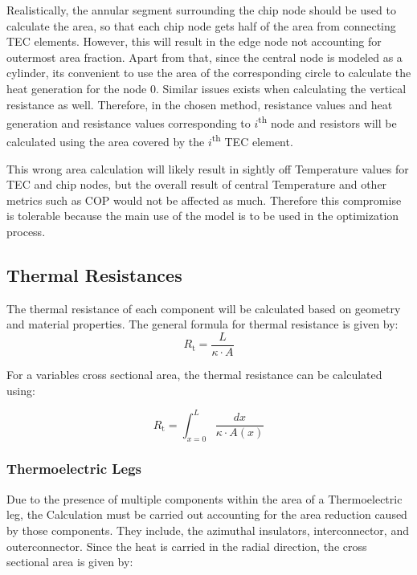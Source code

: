 \documentclass[10pt,a4paper,twocolumn]{article}
\begin{document}
Realistically, the annular segment surrounding the chip node should be used to calculate the area, so that each chip node gets half of the area from connecting TEC elements. However, this will result in the edge node not accounting for outermost area fraction. Apart from that, since the central node is modeled as a cylinder, its convenient to use the area of the corresponding circle to calculate the heat generation for the node 0. Similar issues exists when calculating the vertical resistance as well. Therefore, in the chosen method, resistance values and heat generation and resistance values corresponding to $i$\textsuperscript{th} node and resistors will be calculated using the area covered by the $i$\textsuperscript{th} TEC element.

This wrong area calculation will likely result in sightly off Temperature values for TEC and chip nodes, but the overall result of central Temperature and other metrics such as COP would not be affected as much. Therefore this compromise is tolerable because the main use of the model is to be used in the optimization process.

\subsection{Thermal Resistances}

The thermal resistance of each component will be calculated based on geometry and material properties. The general formula for thermal resistance is given by:
\begin{equation}
  R_{\text{t}} = \frac{L}{\kappa \cdot A}
  \label{eq:thermal_resistance_r}
\end{equation}

For a variables cross sectional area, the thermal resistance can be calculated using:

\begin{equation}
  R_{\text{t}} = \int_{x=0}^{L} \frac{dx}{\kappa \cdot A(x)}
  \label{eq:resistance_r_int}
\end{equation}

\subsubsection{Thermoelectric Legs}

Due to the presence of multiple components within the area of a Thermoelectric leg, the Calculation must be carried out accounting for the area reduction caused by those components. They include, the azimuthal insulators, interconnector, and outerconnector. Since the heat is carried in the radial direction, the cross sectional area is given by:
\end{document}
